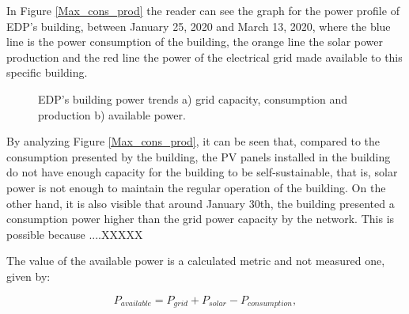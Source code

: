 In Figure \ref{Max_cons_prod} the reader can see the graph for the power profile of \ac{EDP}’s building, between January 25, 2020 and March 13, 2020, where the blue line is the power consumption of the building, the orange line the solar power production and the red line the power of the electrical grid made available to this specific building.


\begin{figure}[h!]
    \captionsetup[subfigure]{position=b}
    \centering
    \label{fig:ap}
    \caption{EDP's building power trends a) grid capacity, consumption and production b) available power.}
\end{figure}




By analyzing Figure \ref{Max_cons_prod}, it can be seen that, compared to the consumption presented by the building, the \ac{PV} panels installed in the building do not have enough capacity for the building to be self-sustainable, that is, solar power is not enough to maintain the regular operation of the building. On the other hand, it is also visible that around January 30th, the building presented a consumption power higher than the grid power capacity by the network. This is possible because ....XXXXX


The value of the available power is a calculated metric and not measured one, given by:

\begin{equation}
   P_{available} = P_{grid} + P_{solar} - P_{consumption},
   \label{available}
\end{equation}

